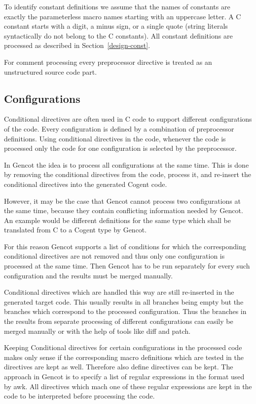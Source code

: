 \documentclass[a4paper]{report}
\begin{document}
To identify constant definitions we assume that the names of constants are exactly the parameterless macro names 
starting with an uppercase letter. A C constant starts with a digit, a minus sign, or a single quote 
(string literals syntactically do not belong to the C constants). All constant definitions are processed
as described in Section~\ref{design-const}.

For comment processing every preprocessor directive is treated as an unstructured source code part.

\subsection{Configurations}

Conditional directives are often used in C code to support different configurations of the code. Every configuration
is defined by a combination of preprocessor definitions. Using conditional directives in the code, whenever the
code is processed only the code for one configuration is selected by the preprocessor.

In Gencot the idea is to process all configurations at the same time. This is done by removing the conditional 
directives from the code, process it, and re-insert the conditional directives into the generated Cogent code.

However, it may be the case that Gencot cannot process two configurations at the same time, because they contain
conflicting information needed by Gencot. An example would be different definitions for the same type which
shall be translated from C to a Cogent type by Gencot.

For this reason Gencot supports a list of conditions for which the corresponding conditional directives are not 
removed and thus only one configuration is processed at the same time. Then Gencot has to be run separately for every
such configuration and the results must be merged manually.

Conditional directives which are handled this way are still re-inserted in the generated target code. This
usually results in all branches being empty but the branches which correspond to the processed configuration.
Thus the branches in the results from separate processing of different configurations can easily be merged manually
or with the help of tools like diff and patch.

Keeping Conditional directives for certain configurations in the processed code makes only sense if the corresponding
macro definitions which are tested in the directives are kept as well. Therefore also define directives can be
kept. The approach in Gencot is to specify a list of regular expressions in the format used by awk. All directives
which mach one of these regular expressions are kept in the code to be interpreted before processing the code.
\end{document}
